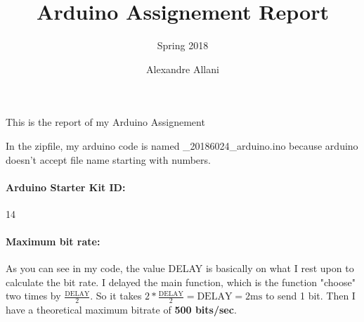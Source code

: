 \documentclass[12pt]{article}
\title{\textbf{Arduino Assignement Report}}
\subtitle{Spring 2018\vspace{-0.8cm}}
\date{\today \\ \rule{18cm}{0.1pt}}
\author{Alexandre Allani}
\begin{document}
\maketitle This is the report of my Arduino Assignement

In the zipfile, my arduino code is named \_20186024\_arduino.ino because arduino doesn't accept file name starting with numbers.

\paragraph{Arduino Starter Kit ID:}14

\paragraph{Maximum bit rate:}
As you can see in my code, the value DELAY is basically on what I rest upon to calculate the bit rate. I delayed the main function, which is the function "choose" two times by $\frac{\text{DELAY}}{2}$. So it takes $2*\frac{\text{DELAY}}{2} = \text{DELAY} = 2\text{ms}$ to send 1 bit. Then I have a theoretical maximum bitrate of \textbf{500 bits/sec}.
\end{document}
